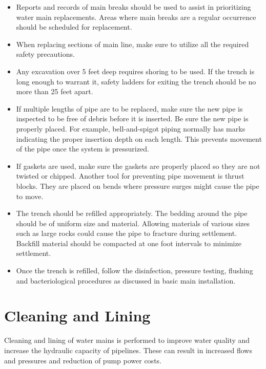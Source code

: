 \documentclass[10pt]{article}
\begin{document}
\begin{itemize}
  \item Reports and records of main breaks should be used to assist in prioritizing water main replacements. Areas where main breaks are a regular occurrence should be scheduled for replacement.

  \item When replacing sections of main line, make sure to utilize all the required safety precautions.

  \item Any excavation over 5 feet deep requires shoring to be used. If the trench is long enough to warrant it, safety ladders for exiting the trench should be no more than 25 feet apart.

  \item If multiple lengths of pipe are to be replaced, make sure the new pipe is inspected to be free of debris before it is inserted. Be sure the new pipe is properly placed. For example, bell-and-spigot piping normally has marks indicating the proper insertion depth on each length. This prevents movement of the pipe once the system is pressurized.

  \item If gaskets are used, make sure the gaskets are properly placed so they are not twisted or chipped. Another tool for preventing pipe movement is thrust blocks. They are placed on bends where pressure surges might cause the pipe to move.

  \item The trench should be refilled appropriately. The bedding around the pipe should be of uniform size and material. Allowing materials of various sizes such as large rocks could cause the pipe to fracture during settlement. Backfill material should be compacted at one foot intervals to minimize settlement.

  \item Once the trench is refilled, follow the disinfection, pressure testing, flushing and bacteriological procedures as discussed in basic main installation.

\end{itemize}
\section{Cleaning and Lining}
Cleaning and lining of water mains is performed to improve water quality and increase the hydraulic capacity of pipelines. These can result in increased flows and pressures and reduction of pump power costs.
\end{document}
